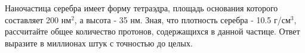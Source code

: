 
Наночастица серебра имеет форму тетраэдра, площадь основания
которого составляет 200 нм$^2$, а высота - 35 нм. Зная, что плотность
серебра - 10.5 г/см$^3$, рассчитайте общее количество протонов,
содержащихся в данной частице. Ответ выразите в миллионах штук с точностью до
целых.



